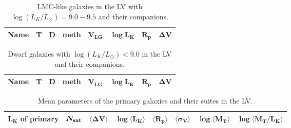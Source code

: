\documentclass[proof]{WileyASNA-v1}
\begin{document}
\begin{center}
\begin{table}[t]%
\centering
\caption{LMC-like galaxies in the LV with $\log(L_K/L_{\odot}) = 9.0-9.5$ and their companions.\label{tab4}}%
\tabcolsep=0pt%
\begin{tabular*}{20pc}{@{\extracolsep\fill}lrrlrrrr@{\extracolsep\fill}}
\toprule
\textbf{Name} & \textbf{T} & \textbf{D} & \textbf{meth} & $\boldsymbol{V_{LG}}$ &
    $\boldsymbol{\log L_K}$ & $\boldsymbol{R_p}$ & $\boldsymbol{\Delta V}$ \\
\midrule

\bottomrule
\end{tabular*}
\end{table}
\end{center}

\begin{center}
\begin{table}[t]%
\centering
\caption{Dwarf galaxies with $\log(L_K/L_{\odot}) < 9.0$ in the LV and their companions.\label{tab5}}%
\tabcolsep=0pt%
\begin{tabular*}{20pc}{@{\extracolsep\fill}lrrlrrrr@{\extracolsep\fill}}
\toprule
\textbf{Name} & \textbf{T} & \textbf{D} & \textbf{meth} & $\boldsymbol{V_{LG}}$ &
    $\boldsymbol{\log L_K}$ & $\boldsymbol{R_p}$ & $\boldsymbol{\Delta V}$ \\
\midrule

\bottomrule
\end{tabular*}
\end{table}
\end{center}

\begin{center}
\begin{table*}[t]%
\caption{Mean parameters of the primary galaxies and their suites in the LV.\label{tab6}}
\centering
\begin{tabular*}{500pt}{@{\extracolsep\fill}lrcccccc@{\extracolsep\fill}}
\toprule
$\boldsymbol{L_K}$ \textbf{of primary} & $\boldsymbol{N_{\rm sat}}$ &
    $\boldsymbol{\langle \Delta V\rangle}$ & $\boldsymbol{\log\langle L_K\rangle}$ &
    $\boldsymbol{\langle R_p\rangle}$ & $\boldsymbol{\langle \sigma _V\rangle}$ &
    $\boldsymbol{\log\langle M_T\rangle}$ & $\boldsymbol{\log\langle M_T/L_K\rangle}$ \\ 
\midrule

\bottomrule
\end{tabular*}
\end{table*}
\end{center}

\clearpage
\appendix
\end{document}
